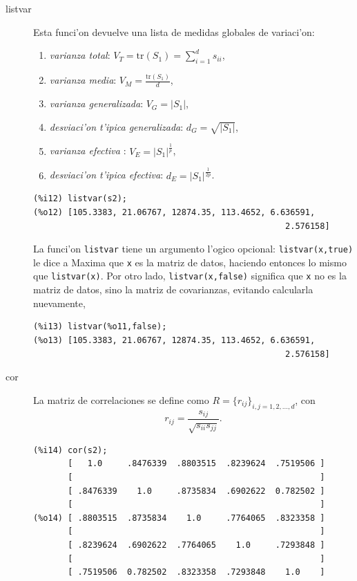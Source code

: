 \documentclass[spanish,12pt,a4paper]{article}
\begin{document}
\begin{description}
\item[listvar] Esta funci'on devuelve una lista de medidas globales de variaci'on:
\begin{enumerate}
\item \emph{varianza total}: $V_T=\mbox{tr}(S_1)=\sum_{i=1}^d s_{ii}$,
\item \emph{varianza media}: $V_M=\frac{\mbox{tr}(S_1)}{d}$,
\item \emph{varianza generalizada}: $V_G=|S_1|$,
\item \emph{desviaci'on t'ipica generalizada}: $d_G=\sqrt{|S_1|}$,
\item \emph{varianza efectiva} \cite{pena}: $V_E=|S_1|^\frac{1}{p}$,
\item \emph{desviaci'on t'ipica efectiva}: $d_E=|S_1|^\frac{1}{2p}$.
\end{enumerate}
\begin{verbatim}
(%i12) listvar(s2);
(%o12) [105.3383, 21.06767, 12874.35, 113.4652, 6.636591,
                                                   2.576158]
\end{verbatim}

La funci'on \verb|listvar| tiene un argumento l'ogico opcional: \verb|listvar(x,true)| le dice a Maxima que \verb|x| es la matriz de datos, haciendo entonces lo mismo que \verb|listvar(x)|. Por otro lado, \verb|listvar(x,false)| significa que \verb|x| no es la matriz de datos, sino la matriz de covarianzas, evitando calcularla nuevamente,
\begin{verbatim}
(%i13) listvar(%o11,false);
(%o13) [105.3383, 21.06767, 12874.35, 113.4652, 6.636591,
                                                   2.576158]
\end{verbatim}


\item[cor] La matriz de correlaciones se define como $R=\{r_{ij}\}_{i,j = 1, 2, \ldots, d}$, con
\[
r_{ij}=\frac{s_{ij}}{\sqrt{s_{ii} s_{jj}}}.
\]
\begin{verbatim}
(%i14) cor(s2);
       [   1.0     .8476339  .8803515  .8239624  .7519506 ]
       [                                                  ]
       [ .8476339    1.0     .8735834  .6902622  0.782502 ]
       [                                                  ]
(%o14) [ .8803515  .8735834    1.0     .7764065  .8323358 ]
       [                                                  ]
       [ .8239624  .6902622  .7764065    1.0     .7293848 ]
       [                                                  ]
       [ .7519506  0.782502  .8323358  .7293848    1.0    ]
\end{verbatim}


\end{description}
\end{document}
